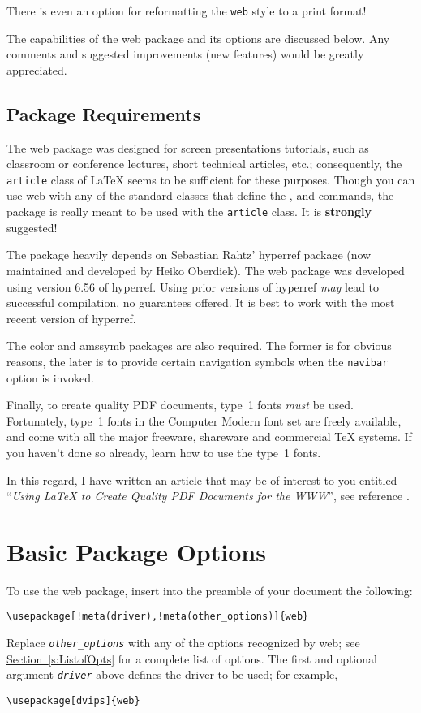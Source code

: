 \documentclass{article}
\def\meta#1{\textit{\texttt{#1}}}
\let\pkg\textsf
\edef\amtIndent{\the\parindent}
\begin{document}
{There is even an option for reformatting the \texttt{web}
style to a print format!

The capabilities of the \pkg{web} package and its options are
discussed below. Any comments and suggested improvements (new
features) would be greatly appreciated.

\subsection{Package Requirements}

The \pkg{web} package was designed for screen presentations
tutorials, such as classroom or conference lectures, short technical
articles, etc.; consequently, the \texttt{article} class of \LaTeX{}
seems to be sufficient for these purposes.  Though you can use
\pkg{web} with any of the standard classes that define the
,  and  commands, the
package is really meant to be used with the \texttt{article}
class.  It is \textbf{strongly} suggested!

The package heavily depends on Sebastian Rahtz' \pkg{hyperref}
package (now maintained and developed by Heiko Oberdiek). The
\pkg{web} package was developed using version 6.56 of
\pkg{hyperref}. Using prior versions of \pkg{hyperref}
\emph{may} lead to successful compilation, no guarantees offered.
It is best to work with the most recent version of
\pkg{hyperref}.

The \textsf{color} and \textsf{amssymb} packages are also
required. The former is for obvious reasons, the later is to
provide certain navigation symbols when the \texttt{navibar}
option is invoked.

Finally, to create quality PDF documents, type~1 fonts \emph{must}
be used. Fortunately, type~1 fonts in the Computer Modern font set
are freely available, and come with all the major
freeware, shareware and commercial \TeX{} systems. If you haven't
done so already, learn how to use the type~1 fonts.

In this regard, I have written an article that may be of interest
to you entitled ``\textit{Using \LaTeX{} to Create Quality PDF Documents
for the WWW}'', see reference \cite{article:Story:LaTeX}.

\section{Basic Package Options}

To use the \pkg{web} package, insert into the preamble of
your document the following:
\begin{Verbatim}[xleftmargin=\amtIndent,commandchars=!()]
\usepackage[!meta(driver),!meta(other_options)]{web}
\end{Verbatim}
\noindent Replace \meta{other\_options} with any of the options recognized by
\pkg{web}; see \hyperref[s:ListofOpts]{Section~\ref*{s:ListofOpts}}
for a complete list of options. The first and optional argument
\meta{driver} above defines the driver to be used; for
example,
\begin{Verbatim}[xleftmargin=\amtIndent]
\usepackage[dvips]{web}
\end{Verbatim}

}
\end{document}
